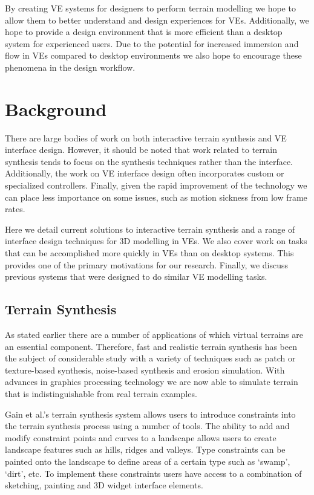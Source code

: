 \documentclass{sig-alternate-05-2015}
\begin{document}
By creating VE systems for designers to perform terrain modelling we hope to allow them to better understand and design experiences for VEs. Additionally, we hope to provide a design environment that is more efficient than a desktop system for experienced users. Due to the potential for increased immersion and flow in VEs compared to desktop environments\cite{Schubert2001} we also hope to encourage these phenomena in the design workflow.
\section{Background}
There are large bodies of work on both interactive terrain synthesis and VE interface design. However, it should be noted that work related to terrain synthesis tends to focus on the synthesis techniques rather than the interface. Additionally, the work on VE interface design often incorporates custom or specialized controllers. Finally, given the rapid improvement of the technology we can place less importance on some issues, such as motion sickness from low frame rates.
 
Here we detail current solutions to interactive terrain synthesis and a range of interface design techniques for 3D modelling in VEs. We also cover work on tasks that can be accomplished more quickly in VEs than on desktop systems. This provides one of the primary motivations for our research. Finally, we discuss previous systems that were designed to do similar VE modelling tasks.
 
\subsection{Terrain Synthesis} 
As stated earlier there are a number of applications of which virtual terrains are an essential component. Therefore, fast and realistic terrain synthesis has been the subject of considerable study with a variety of techniques such as patch or texture-based synthesis\cite{Cruz2015, Tasse2012}, noise-based synthesis\cite{Musgrave1989} and erosion simulation\cite{Anh2007}. With advances in graphics processing technology we are now able to simulate terrain that is indistinguishable from real terrain examples\cite{Gain2015}. 

Gain et al.'s terrain synthesis system allows users to introduce constraints into the terrain synthesis process using a number of tools\cite{Gain2015}. The ability to add and modify constraint points and curves to a landscape allows users to create landscape features such as hills, ridges and valleys. Type constraints can be painted onto the landscape to define areas of a certain type such as `swamp', `dirt', etc. To implement these constraints users have access to a combination of sketching, painting and 3D widget interface elements.
\end{document}
